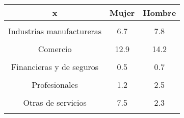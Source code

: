 \begin{tabular}[t]{ccc}
\toprule
\textbf{x} & \textbf{Mujer} & \textbf{Hombre}\\
\midrule
\cellcolor[HTML]{B6B3FF}{Agricultura} & \cellcolor[HTML]{B6B3FF}{3.7} & \cellcolor[HTML]{B6B3FF}{23.4}\\
Industrias manufactureras & 6.7 & 7.8\\
\cellcolor[HTML]{B6B3FF}{Construcción} & \cellcolor[HTML]{B6B3FF}{0.0} & \cellcolor[HTML]{B6B3FF}{7.4}\\
Comercio & 12.9 & 14.2\\
\cellcolor[HTML]{B6B3FF}{Comunicaciones} & \cellcolor[HTML]{B6B3FF}{0.1} & \cellcolor[HTML]{B6B3FF}{0.5}\\
Financieras y de seguros & 0.5 & 0.7\\
\cellcolor[HTML]{B6B3FF}{Inmobiliarias} & \cellcolor[HTML]{B6B3FF}{0.2} & \cellcolor[HTML]{B6B3FF}{0.2}\\
Profesionales & 1.2 & 2.5\\
\cellcolor[HTML]{B6B3FF}{Administración pública} & \cellcolor[HTML]{B6B3FF}{4.1} & \cellcolor[HTML]{B6B3FF}{3.8}\\
Otras de servicios & 7.5 & 2.3\\
\cellcolor[HTML]{B6B3FF}{NS/NR} & \cellcolor[HTML]{B6B3FF}{0.1} & \cellcolor[HTML]{B6B3FF}{0.1}\\
\bottomrule
\end{tabular}

